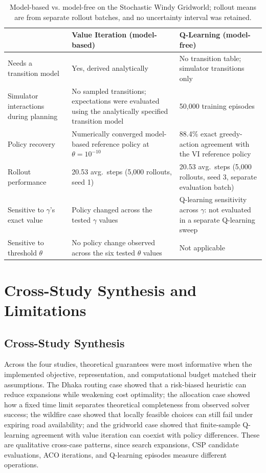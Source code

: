 \documentclass{ai-lab-report}
\begin{document}
\begin{table}[H]
\centering
\small
\caption{Model-based vs. model-free on the Stochastic Windy Gridworld; rollout means are from separate rollout batches, and no uncertainty interval was retained.}
\label{tab:a4-summary}
\begin{tabularx}{\textwidth}{@{}p{3.6cm}XX@{}}
\toprule
 & Value Iteration (model-based) & Q-Learning (model-free) \\
\midrule
Needs a transition model & Yes, derived analytically & No transition table; simulator transitions only \\
Simulator interactions during planning & No sampled transitions; expectations were evaluated using the analytically specified transition model & 50,000 training episodes \\
Policy recovery & Numerically converged model-based reference policy at $\theta=10^{-10}$ & 88.4\% exact greedy-action agreement with the VI reference policy \\
Rollout performance & 20.53 avg.\ steps (5,000 rollouts, seed 1) & 20.53 avg.\ steps (5,000 rollouts, seed 3, separate evaluation batch) \\
Sensitive to $\gamma$'s exact value & Policy changed across the tested $\gamma$ values & Q-learning sensitivity across $\gamma$: not evaluated in a separate Q-learning sweep \\
Sensitive to threshold $\theta$ & No policy change observed across the six tested $\theta$ values & Not applicable \\
\bottomrule
\end{tabularx}
\end{table}


\section{Cross-Study Synthesis and Limitations}
\subsection{Cross-Study Synthesis}
Across the four studies, theoretical guarantees were most informative when the implemented objective, representation, and computational budget matched their assumptions. The Dhaka routing case showed that a risk-biased heuristic can reduce expansions while weakening cost optimality; the allocation case showed how a fixed time limit separates theoretical completeness from observed solver success; the wildfire case showed that locally feasible choices can still fail under expiring road availability; and the gridworld case showed that finite-sample Q-learning agreement with value iteration can coexist with policy differences. These are qualitative cross-case patterns, since search expansions, CSP candidate evaluations, ACO iterations, and Q-learning episodes measure different operations.
\end{document}
